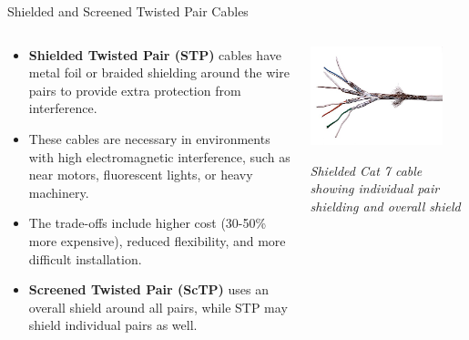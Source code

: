 \documentclass[aspectratio=169]{beamer}
\begin{document}
\begin{frame}{Shielded and Screened Twisted Pair Cables}
    \begin{columns}[T]
        \begin{column}{0.55\textwidth}
            \begin{itemize}
                \item \textbf{Shielded Twisted Pair (STP)} cables have metal foil or braided shielding around the wire pairs to provide extra protection from interference.
                \item These cables are necessary in environments with high electromagnetic interference, such as near motors, fluorescent lights, or heavy machinery.
                \item The trade-offs include higher cost (30-50\% more expensive), reduced flexibility, and more difficult installation.
                \item \textbf{Screened Twisted Pair (ScTP)} uses an overall shield around all pairs, while STP may shield individual pairs as well.
            \end{itemize}
        \end{column}
        \begin{column}{0.4\textwidth}
            \centering
            \includegraphics[width=0.85\textwidth]{S-FTP_CAT_7.jpg}
            \vspace{0.2cm}
            
            \small{\textit{Shielded Cat 7 cable showing individual pair shielding and overall shield}}
        \end{column}
    \end{columns}
\end{frame}
\end{document}

